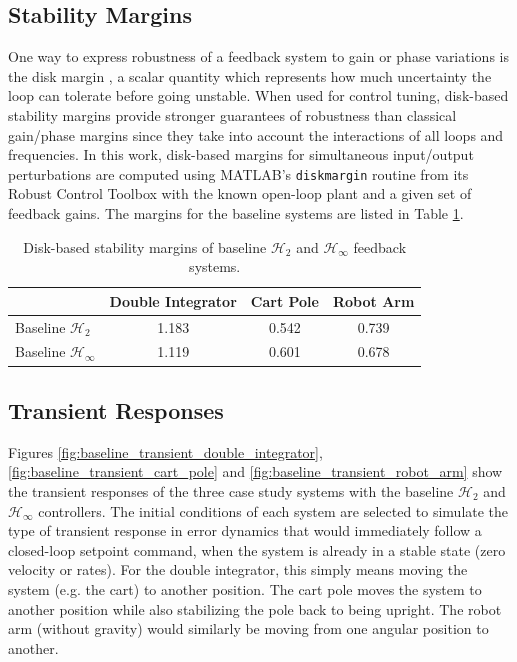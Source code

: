 \subsection{Stability Margins}
One way to express robustness of a feedback system to gain or phase variations is the disk margin \cite{seiler2020introduction}, a scalar quantity which represents how much uncertainty the loop can tolerate before going unstable.  When used for control tuning, disk-based stability margins provide stronger guarantees of robustness than classical gain/phase margins since they take into account the interactions of all loops and frequencies.  In this work, disk-based margins for simultaneous input/output perturbations are computed using MATLAB's \texttt{diskmargin} routine from its Robust Control Toolbox with the known open-loop plant and a given set of feedback gains.  The margins for the baseline systems are listed in Table \ref{table:baseline_disk_margins}.
\begin{table}[H]
\caption{Disk-based stability margins of baseline $\mathcal{H}_{2}$ and $\mathcal{H}_{\infty}$ feedback systems.}
\centering
\begin{tabular}{| l || c | c | c |} 
	\hline
	 & Double Integrator & Cart Pole & Robot Arm\\
	\hline\hline
	Baseline $\mathcal{H}_{2}$ & 1.183 & 0.542 & 0.739\\
	\hline
	Baseline $\mathcal{H}_{\infty}$ & 1.119 & 0.601 & 0.678\\
	\hline
\end{tabular}
\label{table:baseline_disk_margins}
\end{table}

\subsection{Transient Responses}
Figures \ref{fig:baseline_transient_double_integrator}, \ref{fig:baseline_transient_cart_pole} and \ref{fig:baseline_transient_robot_arm} show the transient responses of the three case study systems with the baseline $\mathcal{H}_{2}$ and $\mathcal{H}_{\infty}$ controllers.  The initial conditions of each system are selected to simulate the type of transient response in error dynamics that would immediately follow a closed-loop setpoint command, when the system is already in a stable state (zero velocity or rates).  For the double integrator, this simply means moving the system (e.g. the cart) to another position.  The cart pole moves the system to another position while also stabilizing the pole back to being upright.  The robot arm (without gravity) would similarly be moving from one angular position to another.


